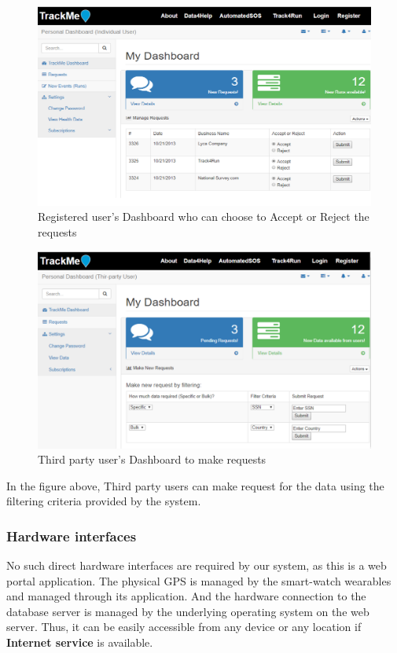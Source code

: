 \documentclass[12pt]{article}
\begin{document}
\begin{figure}[H]
\centering
\includegraphics[scale=0.5]{../Assets/Individual_Request.png}
\caption[UI: Registered user's Dashboard who can choose to Accept or Reject the requests]{Registered user's Dashboard who can choose to Accept or Reject the requests}
\label{fig:Individual_Request}
\end{figure}

\begin{figure}[H]
\centering
\includegraphics[scale=0.5]{../Assets/Make_Request.png}\caption[UI: Third party user's Dashboard to make requests]{Third party user's Dashboard to make requests}
\label{fig:Make_Request}
\end{figure}

In the figure above, Third party users can make request for the data using the filtering criteria provided by the system.

\subsubsection{Hardware interfaces}
No such direct hardware interfaces are required by our system, as this is a web portal application. The physical GPS is managed by the smart-watch wearables and managed through its application. And the hardware connection to the database server is managed by the underlying operating system on the web server. Thus, it can be easily accessible from any device or any location if \textbf{Internet service} is available.
\end{document}
